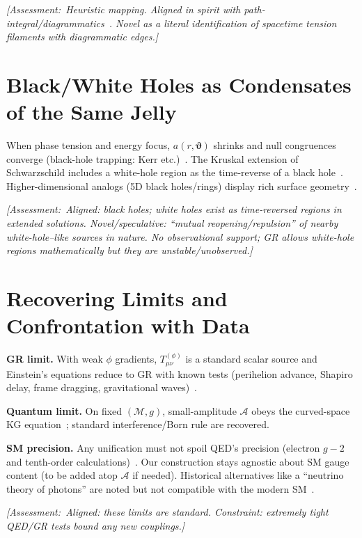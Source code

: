 \documentclass[reprint,amsmath,amssymb,aps,pra]{revtex4-2} %
\newcommand{\M}{\mathcal{M}}                   %
\newcommand{\g}{g}                             %
\newcommand{\A}{\mathcal{A}}                   %
\newcommand{\T}{T}                             %
\newcommand{\polangb}{\boldsymbol{\vartheta}}  %
\newcommand{\Assessment}[1]{\par\smallskip\noindent\textit{\color{blue}[Assessment:\ #1]}\par\smallskip}
\begin{document}
\Assessment{Heuristic mapping. Aligned in spirit with path-integral/diagrammatics~\cite{Feynman1948,Dyson1949}. Novel as a literal identification of spacetime tension filaments with diagrammatic edges.}

\section{Black/White Holes as Condensates of the Same Jelly}
When phase tension and energy focus, $a(r,\polangb)$ shrinks and null congruences converge (black-hole trapping: Kerr etc.)~\cite{Kerr1963,Kraniotis2005}. The Kruskal extension of Schwarzschild includes a white-hole region as the time-reverse of a black hole~\cite{Kruskal1960}. Higher-dimensional analogs (5D black holes/rings) display rich surface geometry~\cite{FrolovGoswami2007}.

\Assessment{Aligned: black holes; white holes exist as time-reversed regions in extended solutions. Novel/speculative: ``mutual reopening/repulsion'' of nearby white-hole–like sources in nature. No observational support; GR allows white-hole regions mathematically but they are unstable/unobserved.}

\section{Recovering Limits and Confrontation with Data}
\textbf{GR limit.} With weak $\phi$ gradients, $\T^{(\phi)}_{\mu\nu}$ is a standard scalar source and Einstein’s equations reduce to GR with known tests (perihelion advance, Shapiro delay, frame dragging, gravitational waves)~\cite{Will2014,GPB2011,LIGO2016,Kraniotis2005}.

\textbf{Quantum limit.} On fixed $(\M,\g)$, small-amplitude $\A$ obeys the curved-space KG equation~\cite{BirrellDavies,ParkerToms}; standard interference/Born rule are recovered.

\textbf{SM precision.} Any unification must not spoil QED’s precision (electron $g-2$ and tenth-order calculations)~\cite{Hanneke2008,Aoyama2012,Parker2018}. Our construction stays agnostic about SM gauge content (to be added atop $\A$ if needed). Historical alternatives like a ``neutrino theory of photons'' are noted but not compatible with the modern SM~\cite{Perkins1965,PDG2024}.

\Assessment{Aligned: these limits are standard. Constraint: extremely tight QED/GR tests bound any new couplings.}
\end{document}
